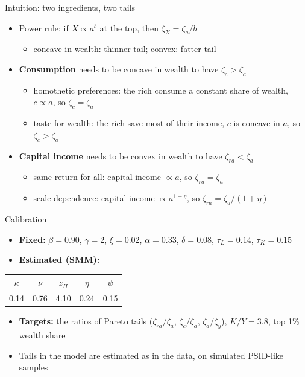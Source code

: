 \documentclass[10pt,english,10pt,handout]{beamer}
\begin{document}
\begin{frame}{Intuition: two ingredients, two tails}
\begin{itemize}
\item Power rule: if $X\propto a^{b}$ at the top, then $\zeta_{X}=\zeta_{a}/b$
\begin{itemize}
\item concave in wealth: thinner tail; convex: fatter tail
\end{itemize}
\item \textbf{Consumption} needs to be concave in wealth to have $\zeta_{c}>\zeta_{a}$
\begin{itemize}
\item homothetic preferences: the rich consume a constant share of wealth, $c\propto a$, so $\zeta_{c}=\zeta_{a}$
\item taste for wealth: the rich save most of their income, $c$ is concave in $a$, so $\zeta_{c}>\zeta_{a}$
\end{itemize}
\item \textbf{Capital income} needs to be convex in wealth to have $\zeta_{ra}<\zeta_{a}$
\begin{itemize}
\item same return for all: capital income $\propto a$, so $\zeta_{ra}=\zeta_{a}$
\item scale dependence: capital income $\propto a^{1+\eta}$, so $\zeta_{ra}=\zeta_{a}/(1+\eta)$
\end{itemize}
\end{itemize}
\end{frame}

\begin{frame}{Calibration}
\begin{itemize}
\item \textbf{Fixed:} $\beta=0.90$, $\gamma=2$, $\xi=0.02$, $\alpha=0.33$, $\delta=0.08$, $\tau_{L}=0.14$, $\tau_{K}=0.15$
\item \textbf{Estimated (SMM):}
\end{itemize}
\begin{center}
\begin{tabular}{ccccc}
\toprule
$\kappa$ & $\nu$ & $z_{H}$ & $\eta$ & $\psi$\\
\midrule
0.14 & 0.76 & 4.10 & 0.24 & 0.15\\
\bottomrule
\end{tabular}
\end{center}
\begin{itemize}
\item \textbf{Targets:} the ratios of Pareto tails ($\zeta_{ra}/\zeta_{a}$, $\zeta_{c}/\zeta_{a}$, $\zeta_{a}/\zeta_{y}$), $K/Y=3.8$, top 1\% wealth share
\item Tails in the model are estimated as in the data, on simulated PSID-like samples
\end{itemize}
\end{frame}
\end{document}
